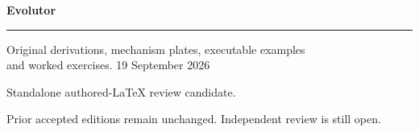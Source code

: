 \documentclass[11pt,oneside,openany]{book}
\begin{document}
\frontmatter
\begin{titlepage}
\color{Blue}\sffamily\vspace*{20mm}
{\Huge\bfseries Evolutor\par}
\vspace{10mm}{\LARGE Chapter 6\par}
\vspace{8mm}{\Large Recurrent models and gated state\par}
\vspace{12mm}\rule{\linewidth}{.8pt}
\vspace{6mm}\par Original derivations, mechanism plates, executable examples\\and worked exercises.
\vfill 19 September 2026\par
Standalone authored-LaTeX review candidate.\par
Prior accepted editions remain unchanged. Independent review is still open.
\end{titlepage}
\tableofcontents
\mainmatter
\setcounter{chapter}{5}

\backmatter

\printindex
\end{document}
